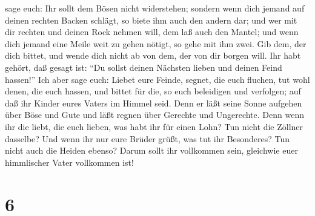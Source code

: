 sage euch: Ihr sollt dem Bösen nicht widerstehen; sondern wenn dich
jemand auf deinen rechten Backen schlägt, so biete ihm auch den andern
dar;  und wer mit dir rechten und deinen Rock nehmen
will, dem laß auch den Mantel;  und wenn dich jemand eine
Meile weit zu gehen nötigt, so gehe mit ihm zwei.  Gib
dem, der dich bittet, und wende dich nicht ab von dem, der von dir
borgen will.  Ihr habt gehört, daß gesagt ist: ``Du
sollst deinen Nächsten lieben und deinen Feind hassen!'' 
Ich aber sage euch: Liebet eure Feinde, segnet, die euch fluchen, tut
wohl denen, die euch hassen, und bittet für die, so euch beleidigen und
verfolgen;  auf daß ihr Kinder eures Vaters im Himmel
seid. Denn er läßt seine Sonne aufgehen über Böse und Gute und läßt
regnen über Gerechte und Ungerechte.  Denn wenn ihr die
liebt, die euch lieben, was habt ihr für einen Lohn? Tun nicht die
Zöllner dasselbe?  Und wenn ihr nur eure Brüder grüßt,
was tut ihr Besonderes? Tun nicht auch die Heiden ebenso?
 Darum sollt ihr vollkommen sein, gleichwie euer
himmlischer Vater vollkommen ist!

\hypertarget{section-5}{%
\section{6}\label{section-5}}

